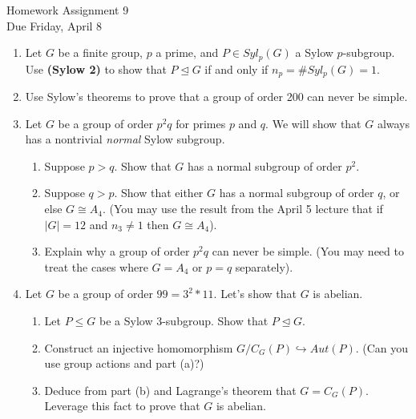 \documentclass[11pt]{article}
\begin{document}
\begin{center}
\Large {Homework Assignment 9}\\
\small {Due Friday, April 8}
\end{center}
\begin{enumerate}
\item Let $G$ be a finite group, $p$ a prime, and $P\in Syl_p(G)$ a Sylow $p$-subgroup.  Use \textbf{(Sylow 2)} to show that $P\unlhd G$ if and only if $n_p = \#Syl_p(G) = 1$.
\item Use Sylow's theorems to prove that a group of order 200 can never be simple.
  \item{
  Let $G$ be a group of order $p^2q$ for primes $p$ and $q$.  We will show that $G$ always has a nontrivial \textit{normal} Sylow subgroup.
  \begin{enumerate}
    \item Suppose $p>q$.  Show that $G$ has a normal subgroup of order $p^2$.
    \item Suppose $q>p$.  Show that either $G$ has a normal subgroup of order $q$, or else $G\cong A_4$.  (You may use the result from the April 5 lecture that if $|G|=12$ and $n_3\not=1$ then $G\cong A_4$).
    \item Explain why a group of order $p^2q$ can never be simple.  (You may need to treat the cases where $G=A_4$ or $p=q$ separately).
  \end{enumerate}
  }
\item Let $G$ be a group of order $99 = 3^2 * 11$.  Let's show that $G$ is abelian.
\begin{enumerate}
\item  Let $P\le G$ be a Sylow 3-subgroup.  Show that $P\unlhd G$.
\item Construct an injective homomorphism $G/C_G(P)\hookrightarrow Aut(P)$.  (Can you use group actions and part (a)?)
\item Deduce from part (b) and Lagrange's theorem that $G=C_G(P)$.  Leverage this fact to prove that $G$ is abelian.
\end{enumerate}
\end{enumerate}
\end{document}
